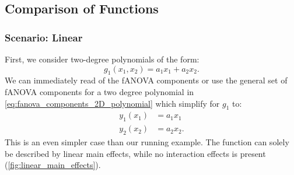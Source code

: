 \subsection{Comparison of Functions}
\subsubsection*{Scenario: Linear}
First, we consider two-degree polynomials of the form:
$$g_1(x_1, x_2) = a_1 x_1 + a_2 x_2.$$
We can immediately read of the fANOVA components or use the general set of fANOVA components for a two degree polynomial in \autoref{eq:fanova_components_2D_polynomial} which simplify for $g_1$ to:
\begin{align*}
    y_1(x_1) &= a_1 x_1 \\
    y_2(x_2) &= a_2 x_2.
\end{align*}
This is an even simpler case than our running example. The function can solely be described by linear main effects, while no interaction effects is present (\autoref{fig:linear_main_effects}).

